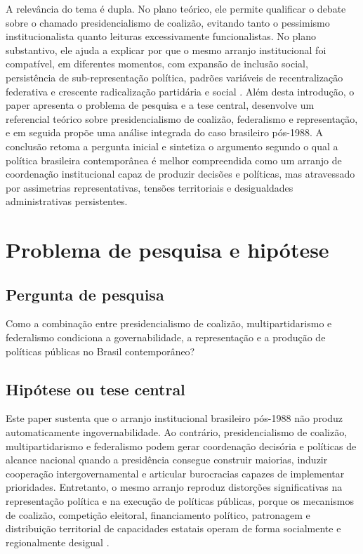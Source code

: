 \documentclass[12pt,a4paper]{article}
\begin{document}
A relevância do tema é dupla. No plano teórico, ele permite qualificar o debate sobre o chamado presidencialismo de coalizão, evitando tanto o pessimismo institucionalista quanto leituras excessivamente funcionalistas. No plano substantivo, ele ajuda a explicar por que o mesmo arranjo institucional foi compatível, em diferentes momentos, com expansão de inclusão social, persistência de sub-representação política, padrões variáveis de recentralização federativa e crescente radicalização partidária e social \parencite{arretche2018_democracia_e,oliveira2019_momentos_da,alves2024_rage_within,rocha2019_imposto_e}.
Além desta introdução, o paper apresenta o problema de pesquisa e a tese central, desenvolve um referencial teórico sobre presidencialismo de coalizão, federalismo e representação, e em seguida propõe uma análise integrada do caso brasileiro pós-1988. A conclusão retoma a pergunta inicial e sintetiza o argumento segundo o qual a política brasileira contemporânea é melhor compreendida como um arranjo de coordenação institucional capaz de produzir decisões e políticas, mas atravessado por assimetrias representativas, tensões territoriais e desigualdades administrativas persistentes.
\section{Problema de pesquisa e hipótese}
\label{sec:orgd5a037d}
\subsection{Pergunta de pesquisa}
\label{sec:org892be81}
Como a combinação entre presidencialismo de coalizão, multipartidarismo e federalismo condiciona a governabilidade, a representação e a produção de políticas públicas no Brasil contemporâneo?
\subsection{Hipótese ou tese central}
\label{sec:org3ee457b}
Este paper sustenta que o arranjo institucional brasileiro pós-1988 não produz automaticamente ingovernabilidade. Ao contrário, presidencialismo de coalizão, multipartidarismo e federalismo podem gerar coordenação decisória e políticas de alcance nacional quando a presidência consegue construir maiorias, induzir cooperação intergovernamental e articular burocracias capazes de implementar prioridades. Entretanto, o mesmo arranjo reproduz distorções significativas na representação política e na execução de políticas públicas, porque os mecanismos de coalizão, competição eleitoral, financiamento político, patronagem e distribuição territorial de capacidades estatais operam de forma socialmente e regionalmente desigual \parencite{limongi2017_a_crise,arretche2018_democracia_e,oliveira2019_momentos_da,campos2017_o_que,sacchet2018_why_gender,mcdonnell2020_patchwork_leviathan}.
\end{document}
